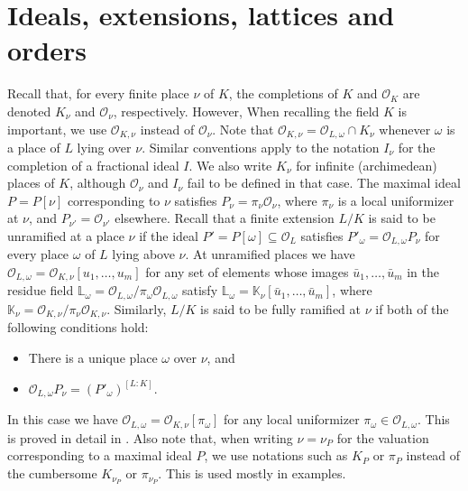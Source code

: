 \documentclass{article}
\theoremstyle{definition}
\theoremstyle{remark}
\begin{document}
\section{Ideals, extensions, lattices and orders}

Recall that, for every finite place $\nu$ of $K$, the completions of $K$ and $\mathcal{O}_K$
are denoted $K_{\nu}$ and $\mathcal{O}_{\nu}$, respectively. However, When recalling the
field $K$ is important, we use $\mathcal{O}_{K,\nu}$ instead of 
$\mathcal{O}_{\nu}$. Note that $\mathcal{O}_{K,\nu}=
\mathcal{O}_{L,\omega}\cap K_{\nu}$
whenever $\omega$ is a place of $L$ lying over $\nu$. 
Similar conventions apply
to the notation $I_{\nu}$ for the completion of a fractional ideal $I$.
We also write $K_{\nu}$
for infinite (archimedean) places of $K$, although $\mathcal{O}_{\nu}$
and $I_{\nu}$ fail to be defined in that case. 
The maximal ideal $P=P[\nu]$ corresponding to $\nu$ satisfies
$P_{\nu}=\pi_{\nu}\mathcal{O}_{\nu}$, where $\pi_{\nu}$ is a 
local uniformizer
at $\nu$, and $P_{\nu'}=\mathcal{O}_{\nu'}$ elsewhere. 
Recall that a finite 
extension $L/K$ is said to be unramified  at a place $\nu$
if the ideal $P'=P[\omega]\subseteq\mathcal{O}_L$ satisfies
 $P'_\omega=\mathcal{O}_{L,\omega}P_{\nu}$ for every 
 place $\omega$ of $L$ lying 
 above $\nu$. At unramified places we have 
 $\mathcal{O}_{L,\omega}=\mathcal{O}_{K,\nu}[u_1,\dots,u_m]$
for any set of elements whose images $\bar{u}_1,\dots,\bar{u}_m$
in the residue field $\mathbb{L}_\omega=
\mathcal{O}_{L,\omega}/\pi_\omega\mathcal{O}_{L,\omega}$
satisfy $\mathbb{L}_\omega=\mathbb{K}_{\nu}[\bar{u}_1,\dots,\bar{u}_m]$,
where $\mathbb{K}_{\nu}=\mathcal{O}_{K,\nu}/\pi_{\nu}\mathcal{O}_{K,\nu}$.
 Similarly, $L/K$ is said to be fully ramified  
 at $\nu$ if both of the following conditions hold:
 \begin{itemize}
     \item There is a unique place $\omega$ over $\nu$, and
     \item $\mathcal{O}_{L,\omega}P_{\nu}=(P'_\omega)^{[L:K]}$.
 \end{itemize}
  In this case we have
 $\mathcal{O}_{L,\omega}=\mathcal{O}_{K,\nu}[\pi_\omega]$ for any local 
 uniformizer $\pi_\omega\in\mathcal{O}_{L,\omega}$. 
 This is proved in detail in \cite[\S 16:4]{O73}.
Also note that, when writing $\nu=\nu_P$
 for the valuation corresponding to a maximal ideal $P$,
 we use notations such as
 $K_P$ or $\pi_P$ instead of the cumbersome
 $K_{\nu_P}$ or $\pi_{\nu_P}$. This is used mostly in 
 examples.
\end{document}
